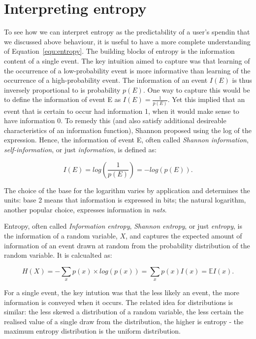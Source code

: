 
\section{Interpreting entropy}%
\label{sec:interpreting_entropy}

To see how we can interpret entropy as the predictability of a user's spendin
that we discussed above behaviour, it is useful to have a more complete
understanding of Equation~\ref{equ:entropy}. The building blocks of entropy is
the information content of a single event. The key intuition
\citet{shannon1948mathematical} aimed to capture was that learning of the
occurrence of a low-probability event is more informative than learning of the
occurrence of a high-probability event. The information of an event $I(E)$ is
thus inversely proportional to is probability $p(E)$. One way to capture this
would be to define the information of event E as $I(E) = \frac{1}{p(E)}$. Yet
this implied that an event that is certain to occur had information 1, when it
would make sense to have information 0. To remedy this (and also satisfy
additional desireable characteristics of an information function), Shannon
proposed using the log of the expression. Hence, the information of event E,
often called \textit{Shannon information}, \textit{self-information}, or just
\textit{information}, is defined as:

\begin{equation}
    I(E) = log\left(\frac{1}{p(E)}\right) = -log(p(E)).
\end{equation}

The choice of the base for the logarithm varies by application and determines
the units: base 2 means that information is expressed in bits; the natural
logarithm, another popular choice, expresses information in \textit{nats}.

Entropy, often called \textit{Information entropy}, \textit{Shannon entropy},
or just \textit{entropy}, is the information of a random variable, $X$, and
captures the expected amount of information of an event drawn at random from
the probability distribution of the random variable. It is calcualted as:

\begin{equation}
    H(X) = -\sum_x p(x) \times log(p(x)) = \sum_x p(x)I(x) = \mathbb{E} I(x).
\end{equation}

For a single event, the key intution was that the less likely an event, the
more information is conveyed when it occurs. The related idea for distributions
is similar: the less skewed a distribution of a random variable, the less
certain the realised value of a single draw from the distribution, the higher
is entropy - the maximum entropy distribution is the uniform distribution.


